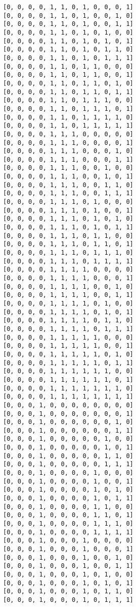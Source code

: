 \documentclass[11pt]{article}
\begin{document}
\begin{Verbatim}[commandchars=\\\{\}]
[0, 0, 0, 0, 1, 1, 0, 1, 0, 0, 0, 1]
[0, 0, 0, 0, 1, 1, 0, 1, 0, 0, 1, 0]
[0, 0, 0, 0, 1, 1, 0, 1, 0, 0, 1, 1]
[0, 0, 0, 0, 1, 1, 0, 1, 0, 1, 0, 0]
[0, 0, 0, 0, 1, 1, 0, 1, 0, 1, 0, 1]
[0, 0, 0, 0, 1, 1, 0, 1, 0, 1, 1, 0]
[0, 0, 0, 0, 1, 1, 0, 1, 0, 1, 1, 1]
[0, 0, 0, 0, 1, 1, 0, 1, 1, 0, 0, 0]
[0, 0, 0, 0, 1, 1, 0, 1, 1, 0, 0, 1]
[0, 0, 0, 0, 1, 1, 0, 1, 1, 0, 1, 0]
[0, 0, 0, 0, 1, 1, 0, 1, 1, 0, 1, 1]
[0, 0, 0, 0, 1, 1, 0, 1, 1, 1, 0, 0]
[0, 0, 0, 0, 1, 1, 0, 1, 1, 1, 0, 1]
[0, 0, 0, 0, 1, 1, 0, 1, 1, 1, 1, 0]
[0, 0, 0, 0, 1, 1, 0, 1, 1, 1, 1, 1]
[0, 0, 0, 0, 1, 1, 1, 0, 0, 0, 0, 0]
[0, 0, 0, 0, 1, 1, 1, 0, 0, 0, 0, 1]
[0, 0, 0, 0, 1, 1, 1, 0, 0, 0, 1, 0]
[0, 0, 0, 0, 1, 1, 1, 0, 0, 0, 1, 1]
[0, 0, 0, 0, 1, 1, 1, 0, 0, 1, 0, 0]
[0, 0, 0, 0, 1, 1, 1, 0, 0, 1, 0, 1]
[0, 0, 0, 0, 1, 1, 1, 0, 0, 1, 1, 0]
[0, 0, 0, 0, 1, 1, 1, 0, 0, 1, 1, 1]
[0, 0, 0, 0, 1, 1, 1, 0, 1, 0, 0, 0]
[0, 0, 0, 0, 1, 1, 1, 0, 1, 0, 0, 1]
[0, 0, 0, 0, 1, 1, 1, 0, 1, 0, 1, 0]
[0, 0, 0, 0, 1, 1, 1, 0, 1, 0, 1, 1]
[0, 0, 0, 0, 1, 1, 1, 0, 1, 1, 0, 0]
[0, 0, 0, 0, 1, 1, 1, 0, 1, 1, 0, 1]
[0, 0, 0, 0, 1, 1, 1, 0, 1, 1, 1, 0]
[0, 0, 0, 0, 1, 1, 1, 0, 1, 1, 1, 1]
[0, 0, 0, 0, 1, 1, 1, 1, 0, 0, 0, 0]
[0, 0, 0, 0, 1, 1, 1, 1, 0, 0, 0, 1]
[0, 0, 0, 0, 1, 1, 1, 1, 0, 0, 1, 0]
[0, 0, 0, 0, 1, 1, 1, 1, 0, 0, 1, 1]
[0, 0, 0, 0, 1, 1, 1, 1, 0, 1, 0, 0]
[0, 0, 0, 0, 1, 1, 1, 1, 0, 1, 0, 1]
[0, 0, 0, 0, 1, 1, 1, 1, 0, 1, 1, 0]
[0, 0, 0, 0, 1, 1, 1, 1, 0, 1, 1, 1]
[0, 0, 0, 0, 1, 1, 1, 1, 1, 0, 0, 0]
[0, 0, 0, 0, 1, 1, 1, 1, 1, 0, 0, 1]
[0, 0, 0, 0, 1, 1, 1, 1, 1, 0, 1, 0]
[0, 0, 0, 0, 1, 1, 1, 1, 1, 0, 1, 1]
[0, 0, 0, 0, 1, 1, 1, 1, 1, 1, 0, 0]
[0, 0, 0, 0, 1, 1, 1, 1, 1, 1, 0, 1]
[0, 0, 0, 0, 1, 1, 1, 1, 1, 1, 1, 0]
[0, 0, 0, 0, 1, 1, 1, 1, 1, 1, 1, 1]
[0, 0, 0, 1, 0, 0, 0, 0, 0, 0, 0, 0]
[0, 0, 0, 1, 0, 0, 0, 0, 0, 0, 0, 1]
[0, 0, 0, 1, 0, 0, 0, 0, 0, 0, 1, 0]
[0, 0, 0, 1, 0, 0, 0, 0, 0, 0, 1, 1]
[0, 0, 0, 1, 0, 0, 0, 0, 0, 1, 0, 0]
[0, 0, 0, 1, 0, 0, 0, 0, 0, 1, 0, 1]
[0, 0, 0, 1, 0, 0, 0, 0, 0, 1, 1, 0]
[0, 0, 0, 1, 0, 0, 0, 0, 0, 1, 1, 1]
[0, 0, 0, 1, 0, 0, 0, 0, 1, 0, 0, 0]
[0, 0, 0, 1, 0, 0, 0, 0, 1, 0, 0, 1]
[0, 0, 0, 1, 0, 0, 0, 0, 1, 0, 1, 0]
[0, 0, 0, 1, 0, 0, 0, 0, 1, 0, 1, 1]
[0, 0, 0, 1, 0, 0, 0, 0, 1, 1, 0, 0]
[0, 0, 0, 1, 0, 0, 0, 0, 1, 1, 0, 1]
[0, 0, 0, 1, 0, 0, 0, 0, 1, 1, 1, 0]
[0, 0, 0, 1, 0, 0, 0, 0, 1, 1, 1, 1]
[0, 0, 0, 1, 0, 0, 0, 1, 0, 0, 0, 0]
[0, 0, 0, 1, 0, 0, 0, 1, 0, 0, 0, 1]
[0, 0, 0, 1, 0, 0, 0, 1, 0, 0, 1, 0]
[0, 0, 0, 1, 0, 0, 0, 1, 0, 0, 1, 1]
[0, 0, 0, 1, 0, 0, 0, 1, 0, 1, 0, 0]
[0, 0, 0, 1, 0, 0, 0, 1, 0, 1, 0, 1]
[0, 0, 0, 1, 0, 0, 0, 1, 0, 1, 1, 0]
[0, 0, 0, 1, 0, 0, 0, 1, 0, 1, 1, 1]

\end{Verbatim}
\end{document}
